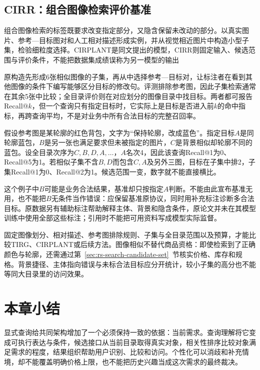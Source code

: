 \subsection{CIRR：组合图像检索评价基准}
\label{sec:rs-search-cirr}

组合图像检索的标签既要求改变指定部分，又隐含保留未改动的部分。以真实图片、参考—目标图对和人工相对描述形成实例，并从视觉相近图片中构造小型子集，检验细粒度选择。CIRPLANT是同文提出的模型，CIRR则固定输入、候选范围与评价条件，不能把数据集成绩误称为另一模型的输出

原构造先形成6张相似图像的子集，再从中选择参考—目标对，让标注者在看到其他图像的条件下编写能够区分目标的修改句。评测排除参考图，因此子集检索通常在其余5张中比较；全目录评价则在对应划分的图像目录中找目标。两者都可报告Recall@$k$，但一个查询只有指定目标时，它实际上是目标是否进入前$k$的命中指标，再跨查询平均，不是对业务中所有合法目标的完整召回率。

假设参考图是某轮廓的红色背包，文字为“保持轮廓，改成蓝色”。指定目标$A$是同轮廓蓝包，$B$是另一张也满足要求但未被指定的图片，$C$是背景相似却轮廓不同的蓝包。设全目录次序为$C,B,D,A,\ldots$，$A$名次4，因此该查询Recall@1为0、Recall@5为1。若相似子集不含$B,D$而包含$C,A$及另外三图，目标在子集中排2，子集Recall@1为0、Recall@2为1。候选范围一变，数字就不能直接横比。

这个例子中$B$可能是业务合法结果，基准却只按指定$A$判断。不能由此宣布基准无用，也不能把$B$无条件当作错误：应保留基准原协议，同时用补充标注诊断多合法目标。原数据另有辅助标注帮助解释主体、背景和隐含条件，原论文并未在其模型训练中使用全部这些标注；引用时不能把可用资料写成模型实际监督。

固定图像划分、相对描述、参考图排除规则、子集与全目录范围以及预算，才能比较TIRG、CIRPLANT或后续方法。图像相似不替代商品资格：即使检索到了正确颜色与轮廓，还需通过第~\ref{sec:rs-search-candidate-set}~节核实价格、库存和规格。背景捷径、主体指向错误与未标合法目标应分开统计，较小子集的高分也不能等同大目录里的访问效果。

\section{本章小结}
\label{sec:rs-search-summary}

显式查询给共同架构增加了一个必须保持一致的依据：当前需求。查询理解将它变成可执行表达与条件，候选接口从当前目录取得真实对象，相关性排序比较对象满足需求的程度，结果组织帮助用户识别、比较和访问。个性化可以消歧和补充情境，却不能覆盖明确价格上限，也不能把历史兴趣当成这次需求的最终裁决。

